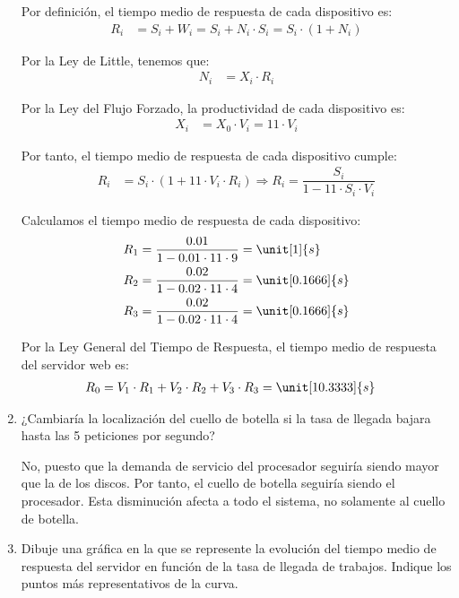 \begin{ejercicio}
\begin{enumerate}
        Por definición, el tiempo medio de respuesta de cada dispositivo es:
        \begin{align*}
            R_i &= S_i + W_i = S_i + N_i \cdot S_i = S_i \cdot (1 + N_i)
        \end{align*}

        Por la Ley de Little, tenemos que:
        \begin{align*}
            N_i &= X_i \cdot R_i
        \end{align*}

        Por la Ley del Flujo Forzado, la productividad de cada dispositivo es:
        \begin{align*}
            X_i &= X_0 \cdot V_i = 11 \cdot V_i
        \end{align*}

        Por tanto, el tiempo medio de respuesta de cada dispositivo cumple:
        \begin{align*}
            R_i &= S_i\cdot \left(1+ 11 \cdot V_i \cdot R_i\right)
            \Longrightarrow R_i = \dfrac{S_i}{1 - 11 \cdot S_i \cdot V_i}
        \end{align*}

        Calculamos el tiempo medio de respuesta de cada dispositivo:
        \begin{align*}
            R_1 &= \dfrac{0.01}{1 - 0.01 \cdot 11 \cdot 9} = \unit[1]{s} \\
            R_2 &= \dfrac{0.02}{1 - 0.02 \cdot 11 \cdot 4} = \unit[0.1666]{s} \\
            R_3 &= \dfrac{0.02}{1 - 0.02 \cdot 11 \cdot 4} = \unit[0.1666]{s}
        \end{align*}

        Por la Ley General del Tiempo de Respuesta, el tiempo medio de respuesta del servidor web es:
        \begin{align*}
            R_0 &= V_1 \cdot R_1 + V_2 \cdot R_2 + V_3 \cdot R_3 = \unit[10.3333]{s}
        \end{align*}
        \item ¿Cambiaría la localización del cuello de botella si la tasa de llegada bajara hasta las 5 peticiones por segundo?
        
        No, puesto que la demanda de servicio del procesador seguiría siendo mayor que la de los discos. Por tanto, el cuello de botella seguiría siendo el procesador. Esta disminución afecta a todo el sistema, no solamente al cuello de botella.
        \item Dibuje una gráfica en la que se represente la evolución del tiempo medio de respuesta del servidor en función de la tasa de llegada de trabajos. Indique los puntos más representativos de la curva.
        

\end{enumerate}
\end{ejercicio}
